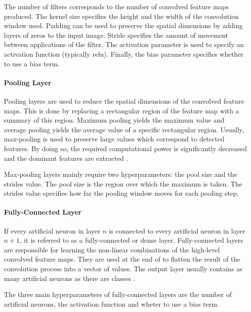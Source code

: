 The number of filters corresponds to the number of convolved feature maps produced.
The kernel size specifies the height and the width of the convolution window used.
Padding can be used to preserve the spatial dimensions by adding layers of zeros to the input image.
Stride specifies the amount of movement between applications of the filter.
The activation parameter is used to specify an activation function (typically \acrshort{relu}).
Finally, the bias parameter specifies whether to use a bias term.

\paragraph{Pooling Layer}
Pooling layers are used to reduce the spatial dimensions of the convolved feature maps.
This is done by replacing a rectangular region of the feature map with a summary of this region.
Maximum pooling yields the maximum value and average pooling yields the average value of a specific rectangular region.
Usually, max-pooling is used to preserve large values which correspond to detected features.
By doing so, the required computational power is significantly decreased and the dominant features are extracted \cite[p.~335--339]{deeplearningbook}.

Max-pooling layers mainly require two hyperparameters: the pool size and the strides value.
The pool size is the region over which the maximum is taken.
The strides value specifies how far the pooling window moves for each pooling step.

\paragraph{Fully-Connected Layer}
If every artificial neuron in layer $n$ is connected to every artificial neuron in layer $n + 1$, it is referred to as a fully-connected or dense layer.
Fully-connected layers are responsible for learning the non-linear combinations of the high-level convolved feature maps.
They are used at the end of  to flatten the result of the convolution process into a vector of values.
The output layer usually contains as many artificial neurons as there are classes \cite{cnn_fc}.

The three main hyperparameters of fully-connected layers are the number of artificial neurons, the activation function and wheter to use a bias term.
